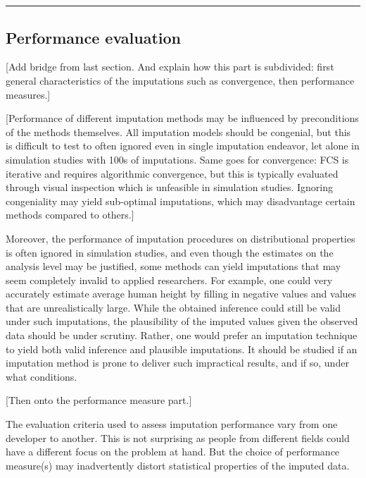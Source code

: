 \documentclass[
]{article}
\begin{document}
\hypertarget{section-2}{%
\section{}\label{section-2}}

\hrule

\hypertarget{performance-evaluation}{%
\subsection{Performance evaluation}\label{performance-evaluation}}

{[}Add bridge from last section. And explain how this part is
subdivided: first general characteristics of the imputations such as
convergence, then performance measures.{]}

{[}Performance of different imputation methods may be influenced by
preconditions of the methods themselves. All imputation models should be
congenial, but this is difficult to test to often ignored even in single
imputation endeavor, let alone in simulation studies with 100s of
imputations. Same goes for convergence: FCS is iterative and requires
algorithmic convergence, but this is typically evaluated through visual
inspection which is unfeasible in simulation studies. Ignoring
congeniality may yield sub-optimal imputations, which may disadvantage
certain methods compared to others.{]}

Moreover, the performance of imputation procedures on distributional
properties is often ignored in simulation studies, and even though the
estimates on the analysis level may be justified, some methods can yield
imputations that may seem completely invalid to applied researchers. For
example, one could very accurately estimate average human height by
filling in negative values and values that are unrealistically large.
While the obtained inference could still be valid under such
imputations, the plausibility of the imputed values given the observed
data should be under scrutiny. Rather, one would prefer an imputation
technique to yield both valid inference and plausible imputations. It
should be studied if an imputation method is prone to deliver such
impractical results, and if so, under what conditions.

{[}Then onto the performance measure part.{]}

The evaluation criteria used to assess imputation performance vary from
one developer to another. This is not surprising as people from
different fields could have a different focus on the problem at hand.
But the choice of performance measure(s) may inadvertently distort
statistical properties of the imputed data.
\end{document}
